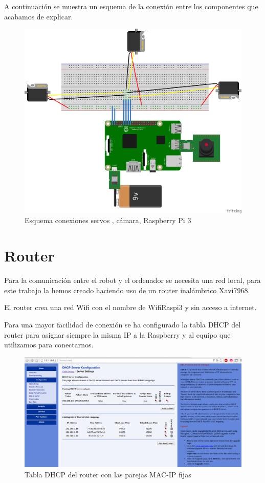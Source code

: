 \documentclass[twoside, 12pt]{epstfg}
\begin{document}
A continuación se muestra un esquema de la conexión entre los componentes que acabamos de explicar.


\begin{figure}[h]
	\centerline{
		\mbox{\includegraphics[width=.95\textwidth]{images/EsquemaServos.png}}
	}
	\caption{Esquema conexiones servos , cámara, Raspberry Pi 3}
\end{figure}


\section{Router}
Para la comunicación entre el robot y el ordenador se necesita una red local,  para este trabajo la hemos creado haciendo uso de un router inalámbrico Xavi7968.

El router crea una red Wifi con el nombre de WifiRaspi3 y sin acceso a internet.

Para una mayor facilidad de conexión se ha configurado la tabla DHCP del router para asignar siempre la misma IP a la Raspberry y al equipo que utilizamos para conectarnos.

\begin{figure}[h]
	\centerline{
		\mbox{\includegraphics[width=.95\textwidth]{images/TablaDHCP2.png}}
	}
	\caption{Tabla DHCP del router con las parejas MAC-IP fijas}
\end{figure}
\end{document}
